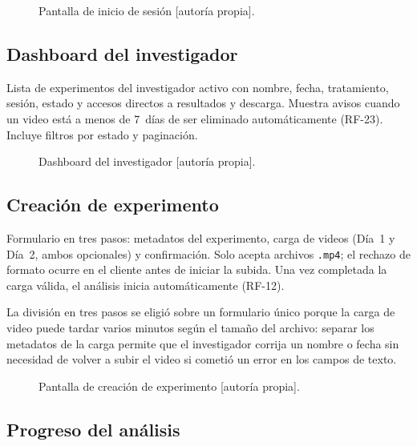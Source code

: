 \begin{figure}[ht]
\centering
\caption{Pantalla de inicio de sesión [autoría propia].}
\label{fig:ui_login}
\end{figure}

\subsection{Dashboard del investigador}

Lista de experimentos del investigador activo con nombre, fecha, tratamiento, sesión,
estado y accesos directos a resultados y descarga. Muestra avisos cuando un video está
a menos de 7~días de ser eliminado automáticamente (RF-23). Incluye filtros por estado
y paginación.

\begin{figure}[ht]
\centering
\caption{Dashboard del investigador [autoría propia].}
\label{fig:ui_dashboard}
\end{figure}

\subsection{Creación de experimento}

Formulario en tres pasos: metadatos del experimento, carga de videos (Día~1 y Día~2,
ambos opcionales) y confirmación. Solo acepta archivos \texttt{.mp4}; el rechazo de
formato ocurre en el cliente antes de iniciar la subida. Una vez completada la carga
válida, el análisis inicia automáticamente (RF-12).

La división en tres pasos se eligió sobre un formulario único porque la carga de video
puede tardar varios minutos según el tamaño del archivo: separar los metadatos de la
carga permite que el investigador corrija un nombre o fecha sin necesidad de volver a
subir el video si cometió un error en los campos de texto.

\begin{figure}[ht]
\centering
\caption{Pantalla de creación de experimento [autoría propia].}
\label{fig:ui_nuevo}
\end{figure}

\subsection{Progreso del análisis}

